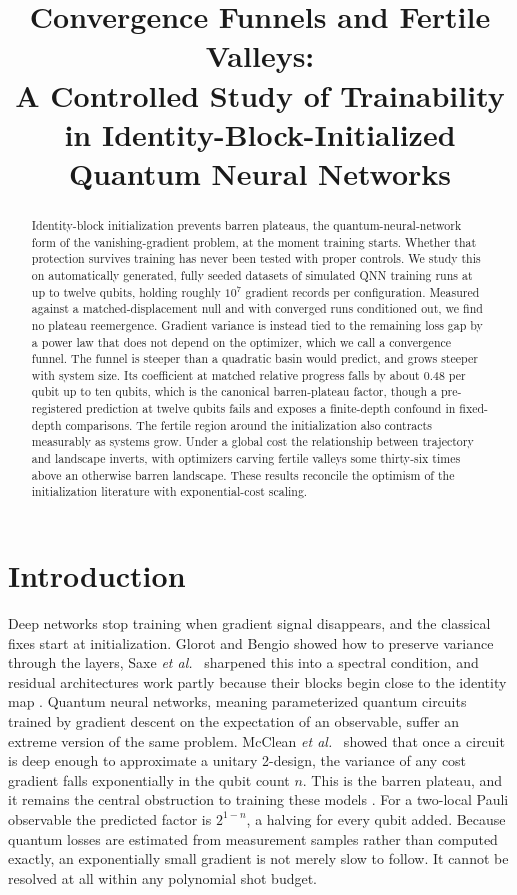\documentclass[conference]{IEEEtran}%
\title{Convergence Funnels and Fertile Valleys:\\ A Controlled Study of Trainability in Identity-Block-Initialized Quantum Neural Networks}
\author{\IEEEauthorblockN{Billy McCarthy}\IEEEauthorblockA{Machine Learning --- Final Report, July 2026}}
\date{}
\begin{document}
\maketitle

\begin{abstract}
Identity-block initialization prevents barren plateaus, the quantum-neural-network form of the vanishing-gradient problem, at the moment training starts. Whether that protection survives training has never been tested with proper controls. We study this on automatically generated, fully seeded datasets of simulated QNN training runs at up to twelve qubits, holding roughly $10^7$ gradient records per configuration. Measured against a matched-displacement null and with converged runs conditioned out, we find no plateau reemergence. Gradient variance is instead tied to the remaining loss gap by a power law that does not depend on the optimizer, which we call a convergence funnel. The funnel is steeper than a quadratic basin would predict, and grows steeper with system size. Its coefficient at matched relative progress falls by about $0.48$ per qubit up to ten qubits, which is the canonical barren-plateau factor, though a pre-registered prediction at twelve qubits fails and exposes a finite-depth confound in fixed-depth comparisons. The fertile region around the initialization also contracts measurably as systems grow. Under a global cost the relationship between trajectory and landscape inverts, with optimizers carving fertile valleys some thirty-six times above an otherwise barren landscape. These results reconcile the optimism of the initialization literature with exponential-cost scaling.
\end{abstract}

\section{Introduction}
Deep networks stop training when gradient signal disappears, and the classical fixes start at initialization. Glorot and Bengio \cite{glorot} showed how to preserve variance through the layers, Saxe \emph{et al.}~\cite{saxe} sharpened this into a spectral condition, and residual architectures work partly because their blocks begin close to the identity map \cite{resnet,hardtma}. Quantum neural networks, meaning parameterized quantum circuits trained by gradient descent on the expectation of an observable, suffer an extreme version of the same problem. McClean \emph{et al.}~\cite{mcclean} showed that once a circuit is deep enough to approximate a unitary 2-design, the variance of any cost gradient falls exponentially in the qubit count $n$. This is the barren plateau, and it remains the central obstruction to training these models \cite{larocca}. For a two-local Pauli observable the predicted factor is $2^{1-n}$, a halving for every qubit added. Because quantum losses are estimated from measurement samples rather than computed exactly, an exponentially small gradient is not merely slow to follow. It cannot be resolved at all within any polynomial shot budget.
\end{document}
